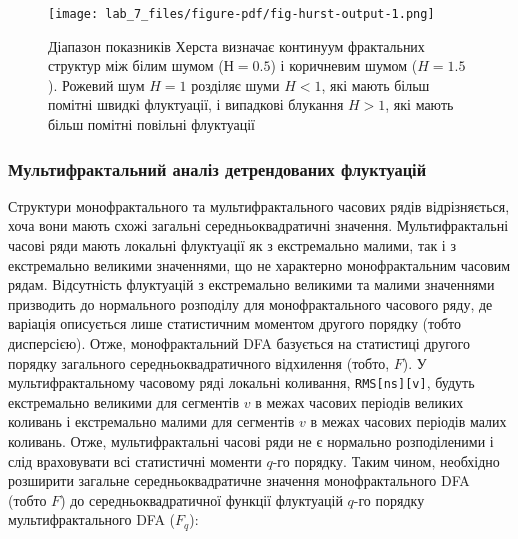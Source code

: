 \documentclass[
  letterpaper,
]{report}
\begin{document}
\begin{figure}[H]

{\centering \texttt{[image: lab\_7\_files/figure-pdf/fig-hurst-output-1.png]}

}

\caption{\label{fig-hurst}Діапазон показників Херста визначає континуум
фрактальних структур між білим шумом (\(Н = 0.5\)) і коричневим шумом
(\(H = 1.5\)). Рожевий шум \(H = 1\) розділяє шуми \(H < 1\), які мають
більш помітні швидкі флуктуації, і випадкові блукання \(H > 1\), які
мають більш помітні повільні флуктуації}

\end{figure}

\hypertarget{ux43cux443ux43bux44cux442ux438ux444ux440ux430ux43aux442ux430ux43bux44cux43dux438ux439-ux430ux43dux430ux43bux456ux437-ux434ux435ux442ux440ux435ux43dux434ux43eux432ux430ux43dux438ux445-ux444ux43bux443ux43aux442ux443ux430ux446ux456ux439-1}{%
\subsubsection{Мультифрактальний аналіз детрендованих
флуктуацій}\label{ux43cux443ux43bux44cux442ux438ux444ux440ux430ux43aux442ux430ux43bux44cux43dux438ux439-ux430ux43dux430ux43bux456ux437-ux434ux435ux442ux440ux435ux43dux434ux43eux432ux430ux43dux438ux445-ux444ux43bux443ux43aux442ux443ux430ux446ux456ux439-1}}

Структури монофрактального та мультифрактального часових рядів
відрізняється, хоча вони мають схожі загальні середньоквадратичні
значення. Мультифрактальні часові ряди мають локальні флуктуації як з
екстремально малими, так і з екстремально великими значеннями, що не
характерно монофрактальним часовим рядам. Відсутність флуктуацій з
екстремально великими та малими значеннями призводить до нормального
розподілу для монофрактального часового ряду, де варіація описується
лише статистичним моментом другого порядку (тобто дисперсією). Отже,
монофрактальний DFA базується на статистиці другого порядку загального
середньоквадратичного відхилення (тобто, \(F\)). У мультифрактальному
часовому ряді локальні коливання, \texttt{RMS{[}ns{]}{[}v{]}}, будуть
екстремально великими для сегментів \(v\) в межах часових періодів
великих коливань і екстремально малими для сегментів \(v\) в межах
часових періодів малих коливань. Отже, мультифрактальні часові ряди не є
нормально розподіленими і слід враховувати всі статистичні моменти
\(q\)-го порядку. Таким чином, необхідно розширити загальне
середньоквадратичне значення монофрактального DFA (тобто \(F\)) до
середньоквадратичної функції флуктуацій \(q\)-го порядку
мультифрактального DFA (\(F_{q}\)):
\end{document}
